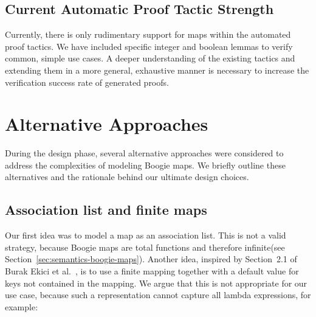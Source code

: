 \subsection{Current Automatic Proof Tactic Strength}
\label{sec:tactic-strength}
Currently, there is only rudimentary support for maps within the automated proof tactics.
We have included specific integer and boolean lemmas to verify common, simple use cases.
A deeper understanding of the existing  tactics and extending them in a more general, exhaustive manner
is necessary to increase the verification success rate of generated proofs.




\section{Alternative Approaches}

During the design phase, several alternative approaches were considered to address the complexities of modeling Boogie maps. We briefly outline these alternatives and the rationale behind our ultimate design choices.

\subsection{Association list and finite maps}
\label{sec:assoc-list}

Our first idea was to model a map as an association list.
This is not a valid strategy, because Boogie maps are total functions and therefore infinite(see Section~\ref{sec:semantics-boogie-maps}).
Another idea, inspired by Section~2.1 of Burak Ekici et al.~\cite{ekici2017smtcoq},
is to use a finite mapping together with a default value for keys not contained in the mapping.
We argue that this is not appropriate for our use case,
because such a representation cannot capture all lambda expressions,
for example:

